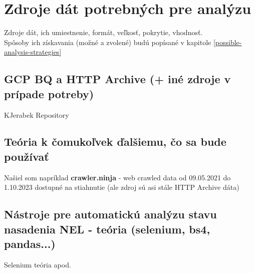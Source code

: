 \chapter{Zdroje dát potrebných pre analýzu}
\label{data-sources-available-for-research}

Zdroje dát, ich umiestnenie, formát, veľkosť, pokrytie, vhodnosť.
\\
Spôsoby ich získavania (možné a zvolené) budú popísané v kapitole \ref{possible-analysis-strategies}


\section{GCP BQ a HTTP Archive (+ iné zdroje v prípade potreby)}

KJerabek Repository

\section{Teória k čomukoľvek ďalšiemu, čo sa bude používať}

Našiel som napríklad \textbf{crawler.ninja} - web crawled data od 09.05.2021 do 1.10.2023 dostupné na stiahnutie (ale zdroj sú asi stále HTTP Archive dáta)

\section{Nástroje pre automatickú analýzu stavu nasadenia NEL - teória (selenium, bs4, pandas...)}

Selenium teória apod.
